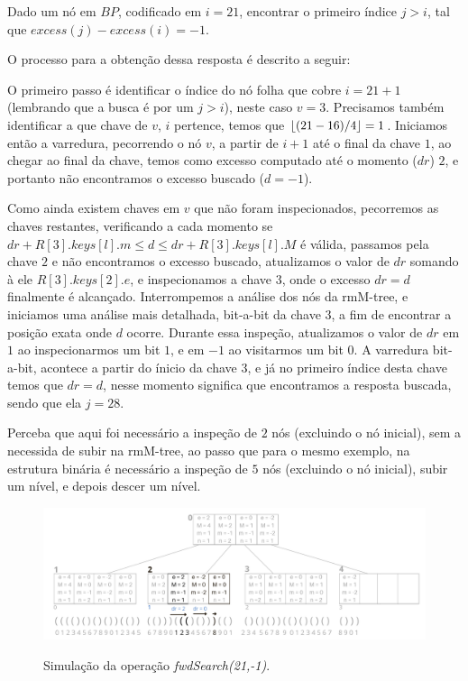         \begin{example}
        Dado um nó em $BP$, codificado em $i=21$, encontrar o primeiro índice $j>i$, tal que $excess(j) - excess(i) = -1$.
   

        O processo para a obtenção dessa resposta é descrito a seguir:
    

         O primeiro passo é identificar  o índice do nó folha que cobre $i=21+1$ (lembrando que a busca é por um $j > i$), neste caso $v = 3$.
         Precisamos também identificar a que chave de $v$, $i$ pertence, temos que $\lfloor(21 - 16)/4\rfloor = 1$. 
         Iniciamos então a varredura, pecorrendo o nó $v$, a partir de $i+1$ até o final da chave $1$, ao chegar ao final da chave, 
         temos como excesso computado até o momento ($dr$) $2$, e portanto não encontramos o excesso buscado ($d=-1$).

         Como ainda existem chaves em $v$ que não foram inspecionados, pecorremos as chaves restantes, verificando a cada momento se $dr + R[3].keys[l].m \leq d \leq dr + R[3].keys[l].M$
         é válida, passamos pela chave $2$ e não encontramos o excesso buscado, atualizamos o valor de $dr$ somando à ele $R[3].keys[2].e$,
         e inspecionamos a chave $3$,  onde o excesso $dr=d$ finalmente é alcançado.
         Interrompemos a análise dos nós da rmM-tree, e iniciamos uma análise mais detalhada, bit-a-bit da chave $3$, a fim de encontrar a posição exata onde $d$ ocorre.
         Durante essa inspeção, atualizamos o valor de $dr$ em $1$ ao inspecionarmos um bit $1$, e em $-1$ ao visitarmos um bit $0$.
         A varredura bit-a-bit, acontece a partir do ínicio da chave $3$, e já no primeiro índice desta chave temos que $dr=d$, nesse momento significa que encontramos
         a resposta buscada, sendo que ela $j = 28$.


         Perceba que aqui foi necessário a inspeção de $2$ nós (excluindo o nó inicial), sem a necessida de subir na rmM-tree, ao passo que para o mesmo exemplo, na estrutura binária é necessário a inspeção de 
         $5$ nós (excluindo o nó inicial), subir um nível, e depois descer um nível.
         
         \begin{figure}[!ht]
            \centering
              \caption[fwdSearch(21,-1).]{Simulação da operação \textit{fwdSearch(21,-1)}.}
              \includegraphics[width=\columnwidth]{images/rmm-tree-kary-fwdsearch.png}
              \label{fig:kary-fwdSearch}
         \end{figure}
        \end{example}
         

